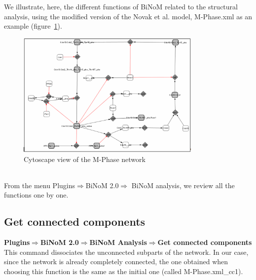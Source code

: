 We illustrate, here, the different functions of BiNoM related to the structural analysis, using the modified version of the Novak et al. model, M-Phase.xml as an example (figure~\ref{Cytoscape_view_of_the_M-Phase_network}).
\begin{figure}
\centering
\includegraphics[width=0.8\textwidth]{graphics/Cytoscape_view_of_the_M-Phase_network.png}
\caption{Cytoscape view of the M-Phase network}
\label{Cytoscape_view_of_the_M-Phase_network}
\end{figure}
\\From the menu Plugins$\Rightarrow$BiNoM 2.0$\Rightarrow$ BiNoM analysis, we review all the functions one by one.

\subsection{Get connected components}
\textbf{Plugins$\Rightarrow$BiNoM 2.0$\Rightarrow$BiNoM Analysis$\Rightarrow$Get connected components}\\
This command dissociates the unconnected subparts of the network. In our case, since the network is already completely connected, the one obtained when choosing this function is the same as the initial one (called M-Phase.xml\_cc1).
